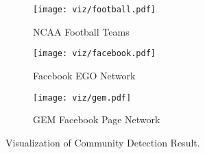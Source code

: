 \begin{figure*}[ht]
    \centering
    \begin{subfigure}[b]{0.32\textwidth}
        \texttt{[image: viz/football.pdf]}
        \caption{NCAA Football Teams}
    \end{subfigure}
    \begin{subfigure}[b]{0.32\textwidth}
        \texttt{[image: viz/facebook.pdf]}
        \caption{Facebook EGO Network}
    \end{subfigure}
    \begin{subfigure}[b]{0.32\textwidth}
        \texttt{[image: viz/gem.pdf]}
        \caption{GEM Facebook Page Network}
    \end{subfigure}
    \caption{Visualization of Community Detection Result.}
    \label{fig:agmviz}
\end{figure*}


